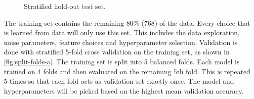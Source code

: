 \documentclass[10pt,a4paper,titlepage]{article}
\begin{document}
\begin{figure}[H]
  \centering
  \caption{Stratified hold-out test set.}
  \label{fig:split-stratified}
\end{figure}
\noindent
The training set contains the remaining 80\% (768) of the data. Every choice that is learned from data will only use this set. This includes the data exploration, noise parameters, feature choices and hyperparameter selection. Validation is done with stratified 5-fold cross validation on the training set, as shown in \autoref{fig:split-folds-a}. The training set is split into 5 balanced folds. Each model is trained on 4 folds and then evaluated on the remaining 5th fold. This is repeated 5 times so that each fold acts as validation set exactly once. The model and hyperparameters will be picked based on the highest mean validation accuracy.
\end{document}
